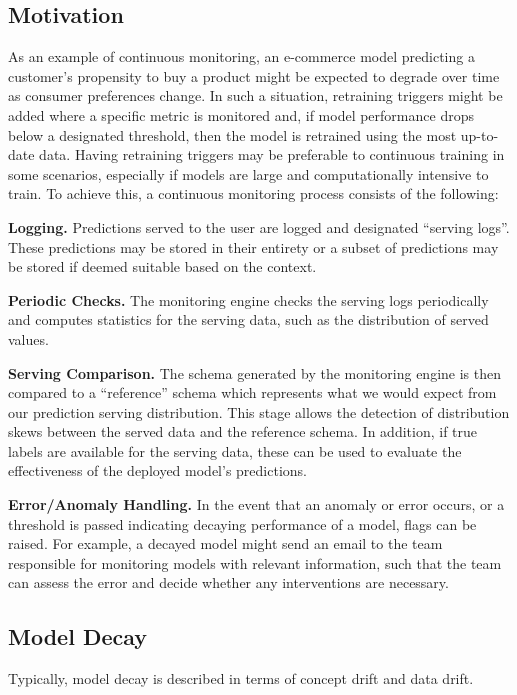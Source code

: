 {{{{{{{{    \subsection{Motivation}
    
    As an example of continuous monitoring, an e-commerce model predicting a customer’s propensity to buy a product might be expected to degrade over time as consumer preferences change. In such a situation, retraining triggers might be added where a specific metric is monitored and, if model performance drops below a designated threshold, then the model is retrained using the most up-to-date data. Having retraining triggers may be preferable to continuous training in some scenarios, especially if models are large and computationally intensive to train. To achieve this, a continuous monitoring process consists of the following:
    
    \textbf{Logging.} Predictions served to the user are logged and designated “serving logs”. These predictions may be stored in their entirety or a subset of predictions may be stored if deemed suitable based on the context.
    
    \textbf{Periodic Checks.} The monitoring engine checks the serving logs periodically and computes statistics for the serving data, such as the distribution of served values.
    
    \textbf{Serving Comparison.} The schema generated by the monitoring engine is then compared to a “reference” schema which represents what we would expect from our prediction serving distribution. This stage allows the detection of distribution skews between the served data and the reference schema. In addition, if true labels are available for the serving data, these can be used to evaluate the effectiveness of the deployed model’s predictions.
    
    \textbf{Error/Anomaly Handling.} In the event that an anomaly or error occurs, or a threshold is passed indicating decaying performance of a model, flags can be raised. For example, a decayed model might send an email to the team responsible for monitoring models with relevant information, such that the team can assess the error and decide whether any interventions are necessary.
    
    \subsection{Model Decay}
    
    Typically, model decay is described in terms of concept drift and data drift.
    
}}}}}}}}
